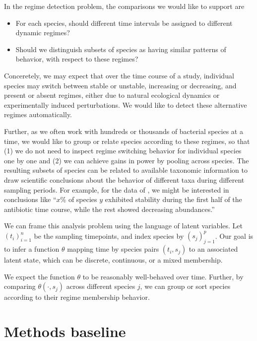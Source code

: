 In the regime detection problem, the comparisons we would like to support are
\begin{itemize}
\item For each species, should different time intervals be assigned to different
  dynamic regimes?
\item Should we distinguish subsets of species as having similar patterns of
  behavior, with respect to these regimes?
\end{itemize}

Conceretely, we may expect that over the time course of a study, individual
species may switch between stable or unstable, increasing or decreasing, and
present or absent regimes, either due to natural ecological dynamics or
experimentally induced perturbations. We would like to detect these alternative
regimes automatically.

Further, as we often work with hundreds or thousands of bacterial species at a
time, we would like to group or relate species according to these regimes, so
that (1) we do not need to inspect regime switching behavior for individual
species one by one and (2) we can achieve gains in power by pooling across
species. The resulting subsets of species can be related to available taxonomic
information to draw scientific conclusions about the behavior of different taxa
during different sampling periods. For example, for the data of
\cite{dethlefsen2011incomplete}, we might be interested in conclusions like
``$x$\% of species $y$ exhibited stability during the first half of the
antibiotic time course, while the rest showed decreasing abundances.''

We can frame this analysis problem using the language of latent variables. Let
$\left(t_{i}\right)_{i = 1}^{n}$ be the sampling timepoints, and index species
by $\left(s_{j}\right)_{j = 1}^{p}$. Our goal is to infer a function $\theta$
mapping time by species pairs $\left(t_{i}, s_{j}\right)$ to an associated
latent state, which can be discrete, continuous, or a mixed membership.

We expect the function $\theta$ to be reasonably well-behaved over time.
Further, by comparing $\theta\left(\cdot, s_{j}\right)$ across different species
$j$, we can group or sort species according to their regime membership behavior.

\section{Methods baseline}
\label{sec:baseline}

